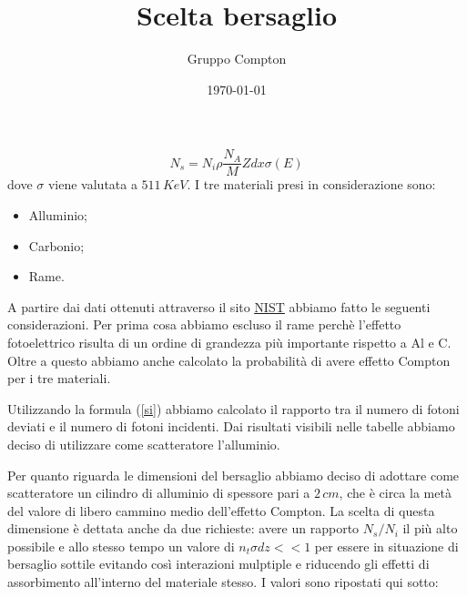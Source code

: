 \documentclass[11pt]{article}
\title{Scelta bersaglio}
\author{Gruppo Compton}
\date{\today}
\begin{document}
\maketitle

\begin{equation}\label{si}
    N_s = N_i \rho \frac{N_A}{M} Z dx \sigma(E)
\end{equation}
dove $\sigma$ viene valutata a $511\, \unit{KeV}$. I tre materiali presi in considerazione sono:
\begin{itemize}
    \item Alluminio;
    \item Carbonio;
    \item Rame.
\end{itemize}
A partire dai dati ottenuti attraverso il sito \href{https://physics.nist.gov/PhysRefData/Xcom/html/xcom1.html}{\underline{NIST}} abbiamo fatto le seguenti considerazioni.
Per prima cosa abbiamo escluso il rame perchè l'effetto fotoelettrico risulta di un ordine di grandezza più importante rispetto a $\mathrm{Al}$ e $\mathrm{C}$. Oltre a questo abbiamo anche calcolato la probabilità di avere effetto Compton per i tre materiali.

Utilizzando la formula (\ref{si}) abbiamo calcolato il rapporto tra il numero di fotoni deviati e il numero di fotoni incidenti. Dai risultati visibili nelle tabelle abbiamo deciso di utilizzare come scatteratore l'alluminio.

Per quanto riguarda le dimensioni del bersaglio abbiamo deciso di adottare come scatteratore un cilindro di alluminio di spessore pari a $2\, \unit{cm}$, che è circa la metà del valore di libero cammino medio dell'effetto Compton. La scelta di questa dimensione è dettata anche da due richieste: avere un rapporto $N_s/N_i$ il più alto possibile e allo stesso tempo un valore di $n_t \sigma dz << 1$ per essere in situazione di bersaglio sottile evitando così interazioni mulptiple e riducendo gli effetti di assorbimento all'interno del materiale stesso. I valori sono ripostati qui sotto:
\end{document}
